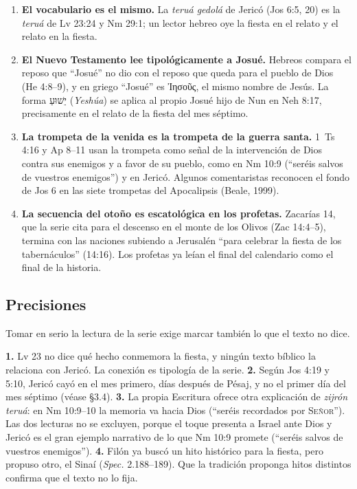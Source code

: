 \documentclass[11pt,letterpaper]{article}
\newcommand{\heb}[1]{\mbox{\foreignlanguage{hebrew}{#1}}}
\newcommand{\grc}[1]{\foreignlanguage{ancientgreek}{#1}}
\newcommand{\SENOR}{\textsc{Señor}}
\begin{document}
\begin{enumerate}\setlength{\itemsep}{2pt}
\item \textbf{El vocabulario es el mismo.} La \emph{teruá gedolá} de Jericó (Jos 6:5, 20) es la \emph{teruá} de Lv 23:24 y Nm 29:1; un lector hebreo oye la fiesta en el relato y el relato en la fiesta.
\item \textbf{El Nuevo Testamento lee tipológicamente a Josué.} Hebreos compara el reposo que ``Josué'' no dio con el reposo que queda para el pueblo de Dios (He 4:8--9), y en griego ``Josué'' es \grc{Ἰησοῦς}, el mismo nombre de Jesús. La forma \heb{יֵשׁוּעַ} (\emph{Yeshúa}) se aplica al propio Josué hijo de Nun en Neh 8:17, precisamente en el relato de la fiesta del mes séptimo.
\item \textbf{La trompeta de la venida es la trompeta de la guerra santa.} 1~Ts 4:16 y Ap 8--11 usan la trompeta como señal de la intervención de Dios contra sus enemigos y a favor de su pueblo, como en Nm 10:9 (``seréis salvos de vuestros enemigos'') y en Jericó. Algunos comentaristas reconocen el fondo de Jos 6 en las siete trompetas del Apocalipsis (Beale, 1999).
\item \textbf{La secuencia del otoño es escatológica en los profetas.} Zacarías 14, que la serie cita para el descenso en el monte de los Olivos (Zac 14:4--5), termina con las naciones subiendo a Jerusalén ``para celebrar la fiesta de los tabernáculos'' (14:16). Los profetas ya leían el final del calendario como el final de la historia.
\end{enumerate}

\clearpage
\subsection{Precisiones}
Tomar en serio la lectura de la serie exige marcar también lo que el texto no dice.

\begin{nota}
\textbf{1.} Lv 23 no dice qué hecho conmemora la fiesta, y ningún texto bíblico la relaciona con Jericó. La conexión es tipología de la serie. \textbf{2.} Según Jos 4:19 y 5:10, Jericó cayó en el mes primero, días después de Pésaj, y no el primer día del mes séptimo (véase §3.4). \textbf{3.} La propia Escritura ofrece otra explicación de \emph{zijrón teruá}: en Nm 10:9--10 la memoria va hacia Dios (``seréis recordados por \SENOR''). Las dos lecturas no se excluyen, porque el toque presenta a Israel ante Dios y Jericó es el gran ejemplo narrativo de lo que Nm 10:9 promete (``seréis salvos de vuestros enemigos''). \textbf{4.} Filón ya buscó un hito histórico para la fiesta, pero propuso otro, el Sinaí (\emph{Spec.} 2.188--189). Que la tradición proponga hitos distintos confirma que el texto no lo fija.
\end{nota}
\end{document}
